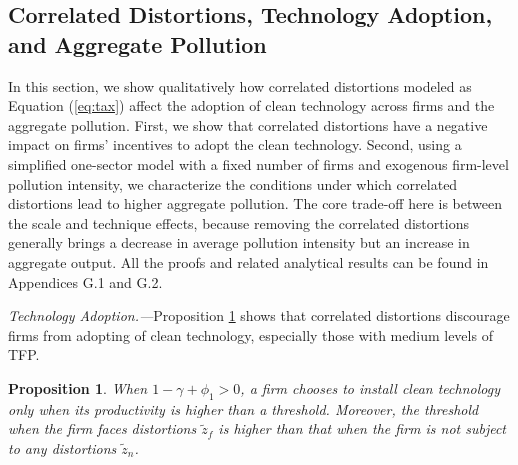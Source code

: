 \documentclass[AEJ]{AEA}
\newtheorem{proposition}{Proposition}
\begin{document}
\subsection{Correlated Distortions, Technology Adoption, and Aggregate Pollution}
\label{sec:analytical}

In this section, we show qualitatively how correlated distortions modeled as Equation (\ref{eq:tax}) affect the adoption of clean technology across firms and the aggregate pollution. First, we show that correlated distortions have a negative impact on firms' incentives to adopt the clean technology. Second, using a simplified one-sector model with a fixed number of firms and exogenous firm-level pollution intensity, we characterize the conditions under which correlated distortions lead to higher aggregate pollution. The core trade-off here is between the scale and technique effects, because removing the correlated distortions generally brings a decrease in average pollution intensity but an increase in aggregate output. All the proofs and related analytical results can be found in Appendices G.1 and G.2.

\textit{Technology Adoption.---}Proposition \ref{prop:friction} shows that correlated distortions discourage firms from adopting of clean technology, especially those with medium levels of TFP.
\begin{proposition}
\label{prop:friction}
When $1-\gamma+\phi_1>0$, a firm chooses to install clean technology only when its productivity is higher than a threshold. Moreover, the threshold when the firm faces distortions $\tilde{z}_f$ is higher than that when the firm is not subject to any distortions $\tilde{z}_n$.
\end{proposition}
\end{document}
